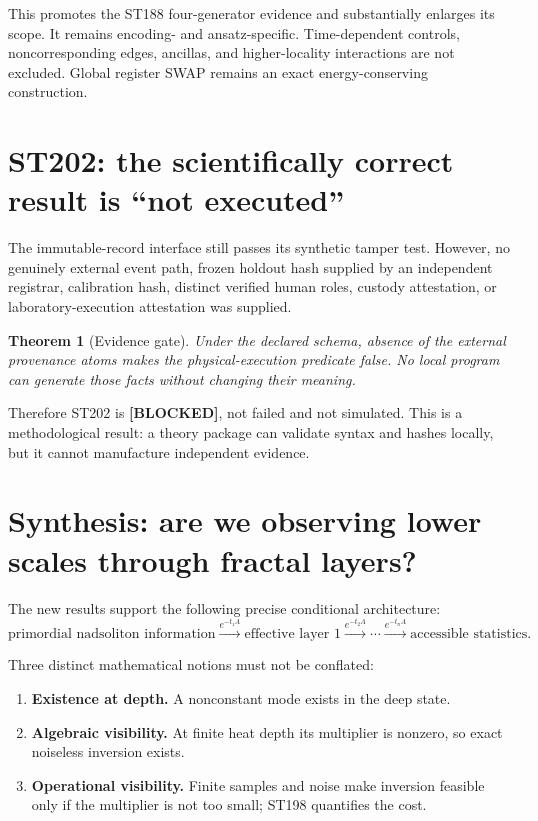 \documentclass[11pt,a4paper]{article}
\newtheorem{theorem}{Theorem}[section]
\newcommand{\blocked}{\textcolor{orange!82!black}{\textbf{[BLOCKED]}}}
\begin{document}
This promotes the ST188 four-generator evidence and substantially enlarges its scope. It remains encoding- and ansatz-specific. Time-dependent controls, noncorresponding edges, ancillas, and higher-locality interactions are not excluded. Global register SWAP remains an exact energy-conserving construction.

\section{ST202: the scientifically correct result is ``not executed''}

The immutable-record interface still passes its synthetic tamper test. However, no genuinely external event path, frozen holdout hash supplied by an independent registrar, calibration hash, distinct verified human roles, custody attestation, or laboratory-execution attestation was supplied.

\begin{theorem}[Evidence gate]
Under the declared schema, absence of the external provenance atoms makes the physical-execution predicate false. No local program can generate those facts without changing their meaning.
\end{theorem}

Therefore ST202 is \blocked{}, not failed and not simulated. This is a methodological result: a theory package can validate syntax and hashes locally, but it cannot manufacture independent evidence.

\section{Synthesis: are we observing lower scales through fractal layers?}

The new results support the following precise conditional architecture:
\[
\text{primordial nadsoliton information}
\xrightarrow{e^{-t_1A}}
\text{effective layer 1}
\xrightarrow{e^{-t_2A}}\cdots
\xrightarrow{e^{-t_nA}}
\text{accessible statistics}.
\]

Three distinct mathematical notions must not be conflated:

\begin{enumerate}
\item \textbf{Existence at depth.} A nonconstant mode exists in the deep state.
\item \textbf{Algebraic visibility.} At finite heat depth its multiplier is nonzero, so exact noiseless inversion exists.
\item \textbf{Operational visibility.} Finite samples and noise make inversion feasible only if the multiplier is not too small; ST198 quantifies the cost.
\end{enumerate}
\end{document}
